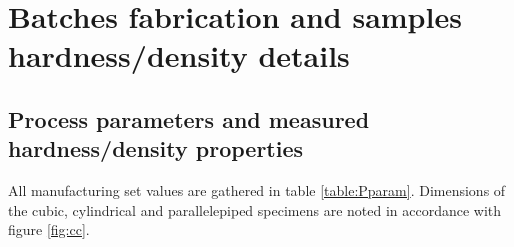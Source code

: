 
\chapter{Batches fabrication and samples hardness/density details} %

\label{AppendixA} %

\section{Process parameters and measured hardness/density properties}
\label{ppa}
All manufacturing set values are gathered in table \ref{table:Pparam}. Dimensions of the cubic, cylindrical and parallelepiped specimens are noted in accordance with figure \ref{fig:cc}.\\

